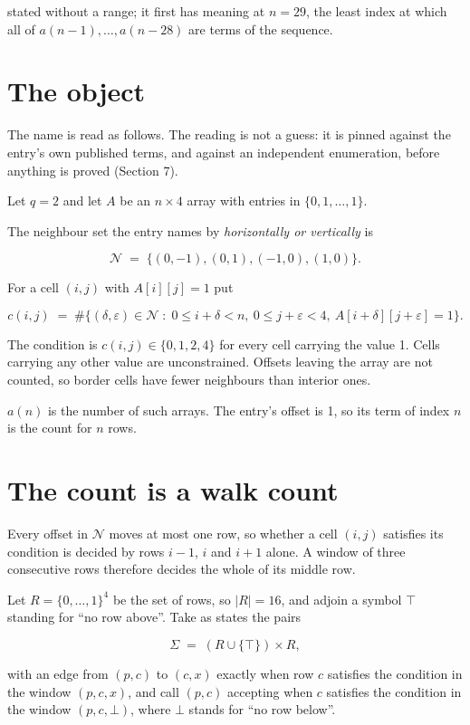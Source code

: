\documentclass[11pt]{article}
\theoremstyle{definition}
\begin{document}
stated without a range; it first has meaning at $n = 29$, the least index at which all of $a(n-1),\dots,a(n-28)$ are terms of the sequence.

\section{The object}

The name is read as follows. The reading is not a guess: it is pinned against the entry's own published terms, and against an independent enumeration, before anything is proved (Section 7).

Let $q = 2$ and let $A$ be an $n \times 4$ array with entries in $\{0,1,\dots,1\}$.

The neighbour set the entry names by {\itshape horizontally or vertically} is

\[\mathcal{N} \;=\; \{(0,-1), (0,1), (-1,0), (1,0)\}.\]

For a cell $(i,j)$ with $A[i][j] = 1$ put

\[c(i,j) \;=\; \#\bigl\{(\delta,\varepsilon)\in\mathcal{N} \;:\; 0\le i+\delta<n,\ 0\le j+\varepsilon<4,\ A[i+\delta][j+\varepsilon] = 1\bigr\}.\]

The condition is $c(i,j) \in \{0, 1, 2, 4\}$ for every cell carrying the value 1. Cells carrying any other value are unconstrained. Offsets leaving the array are not counted, so border cells have fewer neighbours than interior ones.

$a(n)$ is the number of such arrays. The entry's offset is 1, so its term of index $n$ is the count for $n$ rows.

\section{The count is a walk count}

Every offset in $\mathcal{N}$ moves at most one row, so whether a cell $(i,j)$ satisfies its condition is decided by rows $i-1$, $i$ and $i+1$ alone. A window of three consecutive rows therefore decides the whole of its middle row.

Let $R = \{0,\dots,1\}^{4}$ be the set of rows, so $|R| = 16$, and adjoin a symbol $\top$ standing for ``no row above''. Take as states the pairs

\[\Sigma \;=\; (R \cup \{\top\}) \times R,\]

with an edge from $(p,c)$ to $(c,x)$ exactly when row $c$ satisfies the condition in the window $(p,c,x)$, and call $(p,c)$ accepting when $c$ satisfies the condition in the window $(p,c,\bot)$, where $\bot$ stands for ``no row below''.
\end{document}
